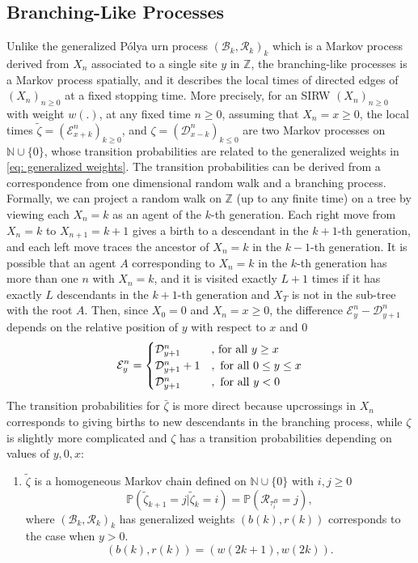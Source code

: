 \documentclass[twoside,12pt,a4paper]{article}
\numberwithin{equation}{section}
\begin{document}
{\subsection{Branching-Like Processes}
Unlike the generalized P\'{o}lya urn process $(\mathcal{B}_k,\mathcal{R}_k )_k$ which is a Markov process derived from $X_n$ associated to a single site $y$ in $\mathbb{Z}$, the branching-like processes is a Markov process spatially, and it describes the local times of directed edges of $(X_n)_{n\geq 0}$ at a fixed stopping time. More precisely, for an SIRW $(X_n)_{n\geq 0}$ with weight $w(.)$, at any fixed time $n \geq 0$, assuming that $X_n = x \geq 0 $, the local times $\tilde{\zeta}= (\mathcal{E}^{n}_{x+k} )_{k\geq 0}$, and ${\zeta}= (\mathcal{D}^{n}_{x-k} )_{k\leq 0}$ are two Markov processes on $\mathbb{N}\cup\{0\}$, whose transition probabilities are related to the generalized weights in \eqref{eq: generalized weights}. The transition probabilities can be derived from a correspondence from one dimensional random walk and a branching process. Formally, we can project a random walk on $\mathbb{Z}$ (up to any finite time) on a tree by viewing each $X_n= k$ as an agent of the $k$-th generation. Each right move from $X_n=k$ to $X_{n+1}=k+1$ gives a birth to a descendant in the $k+1$-th generation, and each left move traces the ancestor of $X_n=k$ in the $k-1$-th generation. It is possible that an agent $A$ corresponding to $X_n=k$ in the $k$-th generation has more than one $n$ with $X_n=k$, and it is visited exactly $L+1$ times if it has exactly $L$ descendants in the $k+1$-th generation and $X_T $ is not in the sub-tree with the root $A$. 
Then, since $X_0=0$ and $X_n =x \geq 0$, the difference $\mathcal{E}^n_y -\mathcal{D}^n_{y+1} $ depends on the relative position of $y$ with respect to $x$ and $0$ 
\begin{equation}\label{eq: edge values}
	\mathcal{E}^n_y =\begin{cases}
		\mathcal{D}^n_{y+1} &\mbox{, for all $y\geq x$}\\
		\mathcal{D}^n_{y+1} +1 &,\mbox{ for all $0 \leq y\leq x$}
		\\
		\mathcal{D}^n_{y+1} &,\mbox{ for all $ y< 0 $}
	\end{cases}
\end{equation}
The transition probabilities for $\bar{\zeta}$ is more direct because upcrossings in $X_n$ corresponds to giving births to new descendants in the branching process, while $\zeta$ is slightly more complicated and $\zeta$ has a transition probabilities depending on values of $y,0,x$: 
\begin{enumerate}
	\item $\tilde{\zeta}$ is a homogeneous Markov chain defined on  $\mathbb{N}\cup\{0\}$ with $i,j\geq 0$
	\begin{equation}\label{eq: transition prob on positive}
		\mathbb{P}\left(\tilde{\zeta}_{k+1}=j \vert \tilde{\zeta}_k =i  \right) = 
		\mathbb{P}\left( \mathcal{R}_{\tau_i^B} = j \right), 
	\end{equation} where $(\mathcal{B}_k,\mathcal{R}_k )_k$ has generalized weights $(b(k), r(k))$ corresponds to the case when $y>0$.
	$$
	(b(k), r(k)) = (w(2k+1), w(2k)).
	$$
	

\end{enumerate}}
\end{document}
